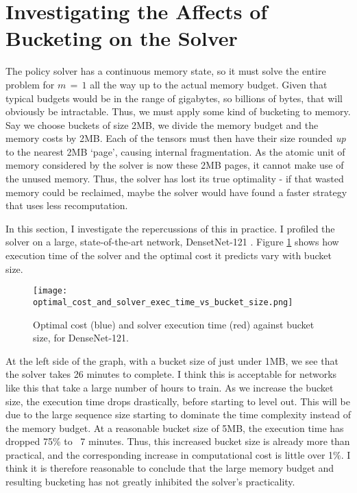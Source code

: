 \section{Investigating the Affects of Bucketing on the Solver}
\label{sec:4-exp-practicality}

The policy solver has a continuous memory state, so it must solve the entire problem for \(m\,=\,1\) all the way up to the actual memory budget.
Given that typical budgets would be in the range of gigabytes, so billions of bytes, that will obviously be intractable.
Thus, we must apply some kind of bucketing to memory.
Say we choose buckets of size 2MB, we divide the memory budget and the memory costs by 2MB.
Each of the tensors must then have their size rounded \textit{up} to the nearest 2MB `page', causing internal fragmentation.
As the atomic unit of memory considered by the solver is now these 2MB pages, it cannot make use of the unused memory.
Thus, the solver has lost its true optimality - if that wasted memory could be reclaimed, maybe the solver would have found a faster strategy that uses less recomputation.

In this section, I investigate the repercussions of this in practice.
I profiled the solver on a large, state-of-the-art network, DensetNet-121 \cite{Huang2017-densenet}.
Figure \ref{fig:4-bucket-size} shows how execution time of the solver and the optimal cost it predicts vary with bucket size.

\begin{figure}[h]
    \centering
    \texttt{[image: optimal\_cost\_and\_solver\_exec\_time\_vs\_bucket\_size.png]}
    \caption{Optimal cost (blue) and solver execution time (red) against bucket size, for DenseNet-121.}
    \label{fig:4-bucket-size}
\end{figure}

At the left side of the graph, with a bucket size of just under 1MB, we see that the solver takes 26 minutes to complete.
I think this is acceptable for networks like this that take a large number of hours to train.
As we increase the bucket size, the execution time drops drastically, before starting to level out.
This will be due to the large sequence size starting to dominate the time complexity instead of the memory budget.
At a reasonable bucket size of 5MB, the execution time has dropped 75\% to ~7 minutes.
Thus, this increased bucket size is already more than practical, and the corresponding increase in computational cost is little over 1\%.
I think it is therefore reasonable to conclude that the large memory budget and resulting bucketing has not greatly inhibited the solver's practicality.

